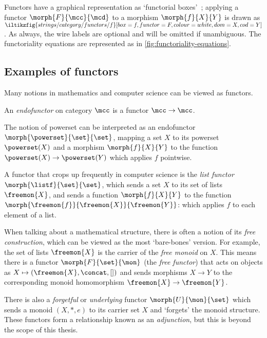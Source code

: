 Functors have a graphical representation as `functorial
boxes'~\cite{mellies2006functorial}; applying a functor \(\morph{F}{\mcc}{\mcd}\)
to a morphism \(\morph{f}{X}{Y}\) is drawn as \(
\iltikzfig{strings/category/functors/f}[box=f,functor=F,colour=white,dom=X,cod=Y]
\).
As always, the wire labels are optional and will be omitted if unambiguous.
The functoriality equations are represented as in
\cref{fig:functoriality-equations}.



\subsection{Examples of functors}

Many notions in mathematics and computer science can be viewed as functors.

\begin{definition}[Endofunctor]
    An \emph{endofunctor} on category \(\mcc\) is a functor \(\mcc \to \mcc\).
\end{definition}

\begin{example}
    The notion of powerset can be interpreted as an endofunctor \(
    \morph{\powerset}{\set}{\set}
    \), mapping a set \(X\) to its powerset \(\powerset(X)\) and a morphism
    \(\morph{f}{X}{Y}\) to the function \(\powerset(X) \to \powerset(Y)\) which
    applies \(f\) pointwise.
\end{example}

\begin{example}\label{ex:list-functor}
    A functor that crops up frequently in computer science is the
    \emph{list functor} \(\morph{\listf}{\set}{\set}\), which sends a set
    \(X\) to its set of lists \(\freemon{X}\), and sends a function
    \(\morph{f}{X}{Y}\) to the function
    \(\morph{\freemon{f}}{\freemon{X}}{\freemon{Y}}\): which applies \(f\)
    to each element of a list.
\end{example}

\begin{example}\label{ex:free-monoid}
    When talking about a mathematical structure, there is often a notion
    of its \emph{free construction}, which can be viewed as the most
    `bare-bones' version.
    For example, the set of lists \(\freemon{X}\) is the carrier of the
    \emph{free monoid} on \(X\).
    This means there is a functor \(\morph{F}{\set}{\mon}\) (the
    \emph{free functor}) that acts on objects as \(
    X \mapsto (\freemon{X}, \concat, [])
    \) and sends morphisms \(X \to Y\) to the corresponding monoid homomorphism
    \(\freemon{X} \to \freemon{Y}\).

    There is also a \emph{forgetful} or \emph{underlying} functor
    \(\morph{U}{\mon}{\set}\) which sends a monoid \((X, *, e)\) to its carrier
    set \(X\) and `forgets' the monoid structure.
    These functors form a relationship known as an \emph{adjunction}, but this
    is beyond the scope of this thesis.
\end{example}

